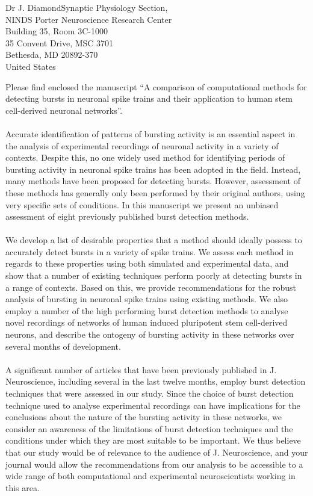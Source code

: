 \documentclass[usebwarms,a4paper,nofold]{damtplet}
\begin{document}
\begin{letter}{Dr J. Diamond}{Synaptic Physiology Section, \\ NINDS
Porter Neuroscience Research Center \\
Building 35, Room 3C-1000 \\
35 Convent Drive, MSC 3701  \\
Bethesda, MD 20892-370 \\
United States}
%
%
{

 Please find enclosed the manuscript ``A comparison of computational methods for detecting bursts in neuronal spike trains and their application to human stem cell-derived neuronal networks''. 
 \\ \\Accurate identification of patterns of bursting activity is an essential aspect in the analysis of experimental recordings of neuronal activity in a variety of contexts. Despite this, no one widely used method for identifying periods of bursting activity in neuronal spike trains has been adopted in the field. Instead, many methods have been proposed for detecting bursts. However, assessment of these methods has generally only been performed by their original authors, using very specific sets of conditions. In this manuscript we present an unbiased assessment of eight previously published burst detection methods. 
 \\ \\We develop a list of desirable properties that a method should ideally possess to accurately detect bursts in a variety of spike trains. We assess each method in regards to these properties using both simulated and experimental data, and show that a number of existing techniques perform poorly at detecting bursts in a range of contexts. Based on this, we provide recommendations for the robust analysis of bursting in neuronal spike trains using existing methods. We also employ a number of the high performing burst detection methods to analyse novel recordings of networks of human induced pluripotent stem cell-derived neurons, and describe the ontogeny of bursting activity in these networks over several months of development.
  \\ \\A significant number of articles that have been previously published in J. Neuroscience, including several in the last twelve months, employ burst detection techniques that were assessed in our study. Since the choice of burst detection technique used to analyse experimental recordings can have implications for the conclusions about the nature of the bursting activity in these networks, we consider an awareness of the limitations of burst detection techniques and the conditions under which they are most suitable to be important. We thus believe that our study would be of relevance to the audience of J. Neuroscience, and your journal would allow the recommendations from our analysis to be accessible to a wide range of both computational and experimental neuroscientists working in this area.
}
\end{letter}
\end{document}
